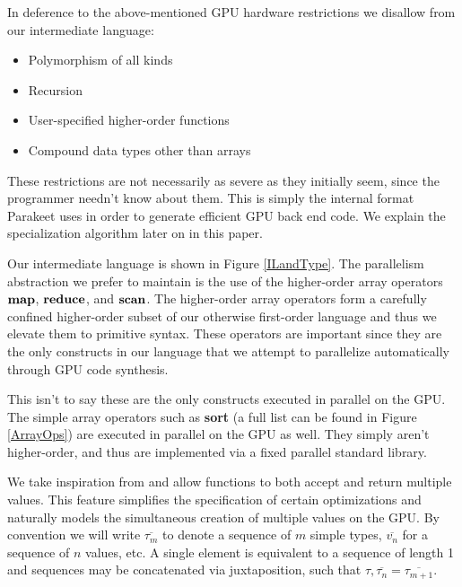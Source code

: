\documentclass[preprint]{sigplanconf}
\begin{document}
In deference to the above-mentioned GPU hardware restrictions we disallow from
our intermediate language:

\begin{itemize}
\item Polymorphism of all kinds
\item Recursion
\item User-specified higher-order functions
\item Compound data types other than arrays
\end{itemize}

These restrictions are not necessarily as severe as they initially seem, since
the programmer needn't know about them.
This is simply the internal format Parakeet uses in
order to generate efficient GPU back end code. We explain the
specialization algorithm later on in this paper.

Our intermediate language is shown in Figure \ref{ILandType}. The parallelism
abstraction we prefer to maintain is the use of the higher-order array operators
$\mbox{\textbf{map}}$, $\mbox{\textbf{reduce}}$, and $\mbox{\textbf{scan}}$. The higher-order array operators
form a carefully confined higher-order subset of our otherwise first-order
language and thus we elevate them to primitive syntax. These operators are
important since they are the only constructs in our language that we attempt to
parallelize automatically through GPU code synthesis.

This isn't to say these are the only constructs executed in parallel on the
GPU. The simple array operators such as \textbf{sort} (a full list can be found
in Figure \ref{ArrayOps}) are executed in parallel on the GPU as well. They
simply aren't higher-order, and thus are implemented via a fixed parallel
standard library.

We take inspiration from \cite{Bol09} and allow functions to both accept and
return multiple values. This feature simplifies the specification of certain
optimizations and naturally models the simultaneous creation of multiple values
on the GPU. By convention we will write $\overline{\tau_m}$ to denote a sequence
of $m$ simple types, $\overline{v_n}$ for a sequence  of $n$ values, etc. A
single element is equivalent to a sequence of length 1 and sequences may be
concatenated via juxtaposition, such that $\tau, \overline{\tau_n} =
\overline{\tau_{m+1}}$.
\end{document}
